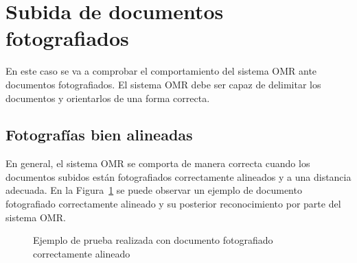 \documentclass[a4paper, 12pt]{book}
\begin{document}
\section{Subida de documentos fotografiados}
\label{sec:doc_fotografiados}

En este caso se va a comprobar el comportamiento del sistema OMR ante
documentos fotografiados. El sistema OMR debe ser capaz de delimitar los
documentos y orientarlos de una forma correcta.

\subsection{Fotografías bien alineadas}
\label{subsec:fotografias_vertical}

En general, el sistema OMR se comporta de manera correcta cuando los
documentos subidos están fotografiados correctamente alineados y a una
distancia adecuada. En la Figura~\ref{figura:test2} se puede observar un ejemplo
de documento fotografiado correctamente alineado y su posterior reconocimiento por parte
del sistema OMR.

\begin{figure}
  \centering
  \caption{Ejemplo de prueba realizada con documento fotografiado correctamente alineado}
  \label{figura:test2}
\end{figure}
\end{document}
